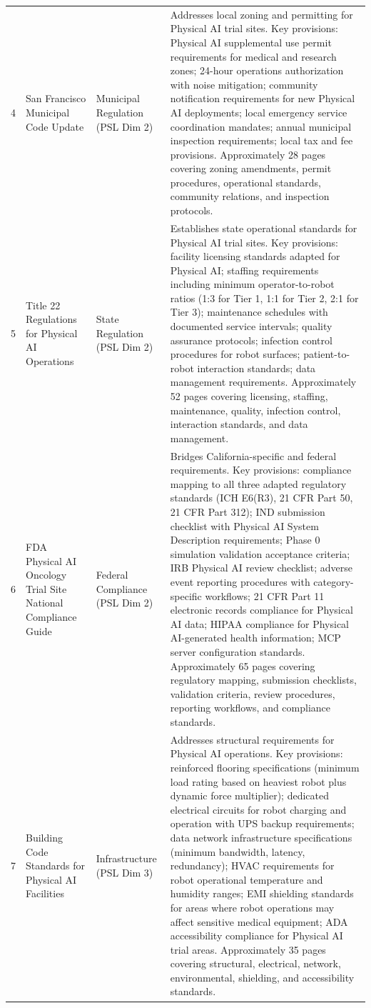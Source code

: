 \begin{longtable}{c >{\raggedright\arraybackslash}p{4.5cm} >{\raggedright\arraybackslash}p{3cm} >{\raggedright\arraybackslash}p{6.5cm}}
4 & San Francisco Municipal Code Update & Municipal Regulation (PSL Dim 2) & Addresses local zoning and permitting for Physical AI trial sites. Key provisions: Physical AI supplemental use permit requirements for medical and research zones; 24-hour operations authorization with noise mitigation; community notification requirements for new Physical AI deployments; local emergency service coordination mandates; annual municipal inspection requirements; local tax and fee provisions. Approximately 28 pages covering zoning amendments, permit procedures, operational standards, community relations, and inspection protocols. \\
5 & Title 22 Regulations for Physical AI Operations & State Regulation (PSL Dim 2) & Establishes state operational standards for Physical AI trial sites. Key provisions: facility licensing standards adapted for Physical AI; staffing requirements including minimum operator-to-robot ratios (1:3 for Tier 1, 1:1 for Tier 2, 2:1 for Tier 3); maintenance schedules with documented service intervals; quality assurance protocols; infection control procedures for robot surfaces; patient-to-robot interaction standards; data management requirements. Approximately 52 pages covering licensing, staffing, maintenance, quality, infection control, interaction standards, and data management. \\
6 & FDA Physical AI Oncology Trial Site National Compliance Guide & Federal Compliance (PSL Dim 2) & Bridges California-specific and federal requirements. Key provisions: compliance mapping to all three adapted regulatory standards (ICH E6(R3), 21 CFR Part 50, 21 CFR Part 312); IND submission checklist with Physical AI System Description requirements; Phase 0 simulation validation acceptance criteria; IRB Physical AI review checklist; adverse event reporting procedures with category-specific workflows; 21 CFR Part 11 electronic records compliance for Physical AI data; HIPAA compliance for Physical AI-generated health information; MCP server configuration standards. Approximately 65 pages covering regulatory mapping, submission checklists, validation criteria, review procedures, reporting workflows, and compliance standards. \\
7 & Building Code Standards for Physical AI Facilities & Infrastructure (PSL Dim 3) & Addresses structural requirements for Physical AI operations. Key provisions: reinforced flooring specifications (minimum load rating based on heaviest robot plus dynamic force multiplier); dedicated electrical circuits for robot charging and operation with UPS backup requirements; data network infrastructure specifications (minimum bandwidth, latency, redundancy); HVAC requirements for robot operational temperature and humidity ranges; EMI shielding standards for areas where robot operations may affect sensitive medical equipment; ADA accessibility compliance for Physical AI trial areas. Approximately 35 pages covering structural, electrical, network, environmental, shielding, and accessibility standards. \\

\end{longtable}
